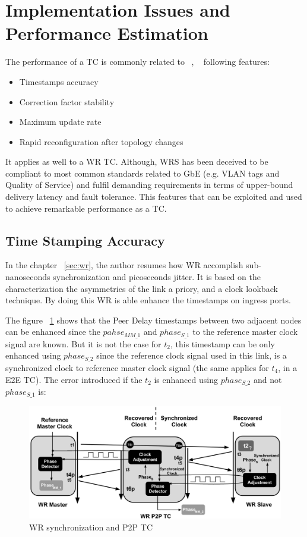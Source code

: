 \section{Implementation Issues and Performance Estimation}
\label{sec:issues}

The performance of a TC is commonly related to ~\cite{biblio:tc_perf},
~\cite{biblio:tc_perf_2} following features: 

\begin{itemize}
    \item Timestamps accuracy 
    \item Correction factor stability
    \item Maximum update rate
    \item Rapid reconfiguration after topology changes
\end{itemize}

It applies as well to a WR TC. Although, WRS has been deceived to be compliant
to most common standards related to GbE (e.g. VLAN tags and Quality of Service) and 
fulfil demanding requirements in terms of upper-bound delivery latency and fault tolerance. 
This features that can be exploited and used to achieve remarkable performance as a TC.

\subsection{Time Stamping Accuracy}

In the chapter ~\ref{sec:wr}, the author resumes how WR accomplish
sub-nanoseconds synchronization and picoseconds jitter. It is based on the
characterization the asymmetries of the link a priory, and a clock lookback
technique. By doing this WR is able enhance the timestamps on ingress ports. 

The figure ~\ref{fig:time_stamp} shows that the Peer Delay timestamps between two 
adjacent nodes can be enhanced since the $pahse_{MM\_1}$ and $phase_{S\_1}$ to
the reference master clock signal are known. But it is not the case for $t_{2}$, 
this timestamp can be only enhanced using $phase_{S\_2}$ since the reference clock 
signal used in this link, is a synchronized clock to reference master clock signal 
(the same applies for $t_{4}$, in a E2E TC). The error introduced if the $t_{2}$ is 
enhanced using $phase_{S\_2}$ and not $phase_{S\_1}$ is:

\begin{figure}[!t]
\centering
\includegraphics[scale=0.43]{fig/time_stamps_tc.png}
\caption{WR synchronization and P2P TC}
\label{fig:time_stamp}
\end{figure}

